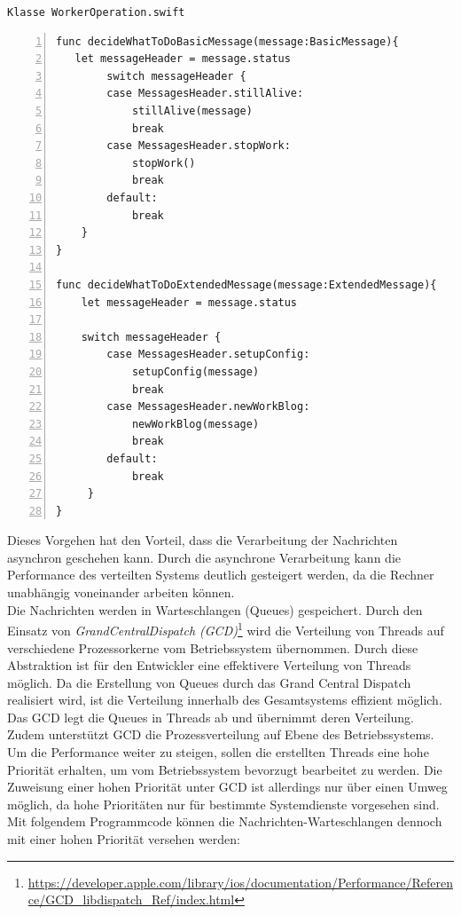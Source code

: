 \texttt{Klasse WorkerOperation.swift}
\begin{lstlisting}[basicstyle=\ttfamily,numbers=left,numberstyle=\footnotesize\ttfamily,backgroundcolor=\color{sourcegray}]
func decideWhatToDoBasicMessage(message:BasicMessage){
   let messageHeader = message.status
        switch messageHeader {
        case MessagesHeader.stillAlive:
            stillAlive(message)
            break
        case MessagesHeader.stopWork:
            stopWork()
            break
        default:
            break
    }
}

func decideWhatToDoExtendedMessage(message:ExtendedMessage){
    let messageHeader = message.status
    
    switch messageHeader {
        case MessagesHeader.setupConfig:
            setupConfig(message)
            break
        case MessagesHeader.newWorkBlog:
            newWorkBlog(message)
            break
        default:
            break
     }
}
\end{lstlisting}

Dieses Vorgehen hat den Vorteil, dass die Verarbeitung der Nachrichten asynchron geschehen kann. Durch die asynchrone Verarbeitung kann die Performance des verteilten Systems deutlich gesteigert werden, da die Rechner unabhängig voneinander arbeiten können. \\
Die Nachrichten werden in Warteschlangen (Queues) gespeichert. Durch den Einsatz von \emph{GrandCentralDispatch (GCD)}\footnote{\url{https://developer.apple.com/library/ios/documentation/Performance/Reference/GCD_libdispatch_Ref/index.html}} wird die Verteilung von Threads auf verschiedene Prozessorkerne vom Betriebssystem übernommen. Durch diese Abstraktion ist für den Entwickler eine effektivere Verteilung von Threads möglich. Da die Erstellung von Queues durch das Grand Central Dispatch realisiert wird, ist die Verteilung innerhalb des Gesamtsystems effizient möglich. Das GCD legt die Queues in Threads ab und übernimmt deren Verteilung. Zudem unterstützt GCD die Prozessverteilung auf Ebene des Betriebssystems.\\
Um die Performance weiter zu steigen, sollen die erstellten Threads eine hohe Priorität erhalten, um vom Betriebssystem bevorzugt bearbeitet zu werden. Die Zuweisung einer hohen Priorität unter GCD ist allerdings nur über einen Umweg möglich, da hohe Prioritäten nur für bestimmte Systemdienste vorgesehen sind. Mit folgendem Programmcode können die Nachrichten-Warteschlangen dennoch mit einer hohen Priorität versehen werden:


